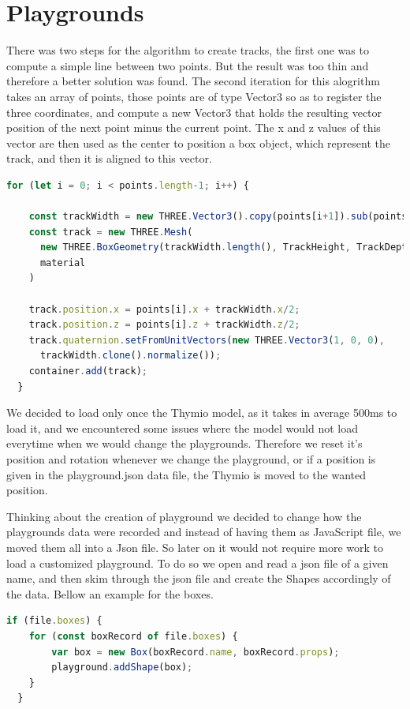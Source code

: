 \documentclass{scrbook}
\begin{document}
\section{Playgrounds}

There was two steps for the algorithm to create tracks, the first one was to compute a simple line between two points. But the result was 
too thin and therefore a better solution was found.
The second iteration for this alogrithm takes an array of points, those points are of type Vector3 so as to register the three coordinates, and compute 
a new Vector3 that holds the resulting vector position of the next point minus the current point. The x and z values of this vector are then used 
as the center to position a box object, which represent the track, and then it is aligned to this vector.
\begin{lstlisting}[language=JavaScript, basicstyle=\ttfamily\small]
  for (let i = 0; i < points.length-1; i++) {

    const trackWidth = new THREE.Vector3().copy(points[i+1]).sub(points[i]);
    const track = new THREE.Mesh(
      new THREE.BoxGeometry(trackWidth.length(), TrackHeight, TrackDepth),
      material
    )

    track.position.x = points[i].x + trackWidth.x/2;
    track.position.z = points[i].z + trackWidth.z/2;
    track.quaternion.setFromUnitVectors(new THREE.Vector3(1, 0, 0), 
      trackWidth.clone().normalize());
    container.add(track);      
  }
\end{lstlisting} 

We decided to load only once the Thymio model, as it takes in average 500ms to load it, and we encountered some issues where the model would not load everytime when we would change the playgrounds.
Therefore we reset it's position and rotation whenever we change the playground, or if a position is given in the playground.json data file, the Thymio is moved to the wanted position.

Thinking about the creation of playground we decided to change how the playgrounds data were recorded and instead of having them as JavaScript file, we moved them all into a Json file. So later on it would not require more work to load a 
customized playground. To do so we open and read a json file of a given name, and then skim through the json file and create the Shapes accordingly of the data. Bellow an example for the boxes.
\begin{lstlisting}[language=JavaScript, basicstyle=\ttfamily\small]
  if (file.boxes) {
    for (const boxRecord of file.boxes) {
        var box = new Box(boxRecord.name, boxRecord.props);
        playground.addShape(box);
    }
  }
\end{lstlisting} 
\end{document}
